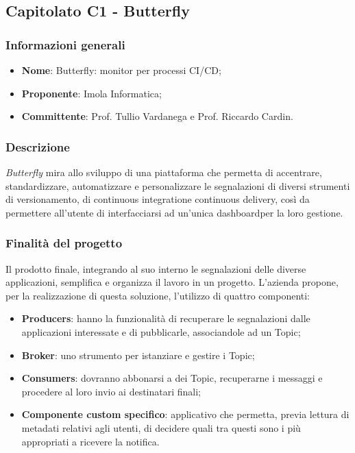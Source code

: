 \subsection{Capitolato C1 - Butterfly}
\subsubsection{Informazioni generali}
\begin{itemize}
\item
\textbf{Nome}: Butterfly: monitor per processi CI/CD;
\item
\textbf{Proponente}: Imola Informatica;
\item
\textbf{Committente}: Prof. Tullio Vardanega e Prof. Riccardo Cardin.
\end{itemize}
\subsubsection{Descrizione}
\textit{Butterfly} mira allo sviluppo di una piattaforma che permetta di
 accentrare, standardizzare, automatizzare e personalizzare le segnalazioni di diversi strumenti di versionamento, di continuous integration\glosp e continuous delivery\glo , così da permettere all'utente di interfacciarsi ad un'unica dashboard\glosp per la loro gestione.

\subsubsection{Finalità del progetto}
Il prodotto finale, integrando al suo interno le segnalazioni delle diverse 
applicazioni, semplifica e organizza il lavoro in un progetto. L'azienda propone,
per la realizzazione di questa soluzione, l'utilizzo di quattro componenti:
\begin{itemize}
	\item \textbf{Producers}: hanno la funzionalità di recuperare le segnalazioni dalle applicazioni interessate e di pubblicarle, associandole ad un Topic;
	\item \textbf{Broker}: uno strumento per istanziare e gestire i Topic;
	\item \textbf{Consumers}: dovranno abbonarsi a dei Topic, recuperarne i messaggi e procedere al loro invio ai destinatari finali;
    \item \textbf{Componente custom specifico}: applicativo che permetta, previa lettura di metadati relativi agli utenti, di decidere quali tra questi sono i più appropriati a ricevere la notifica.
\end{itemize}
